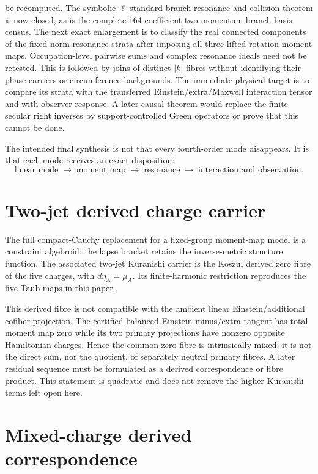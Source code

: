 \documentclass[11pt]{article}
\theoremstyle{definition}
\theoremstyle{remark}
\begin{document}
be recomputed.
The symbolic-\(\ell\) standard-branch resonance and collision theorem is now
closed, as is the complete 164-coefficient two-momentum branch-basis census.
The next exact enlargement is to classify the real connected components of
the fixed-norm resonance strata after imposing all three lifted rotation
moment maps.  Occupation-level pairwise sums and complex resonance ideals need
not be retested.  This is followed by joins of distinct \(|k|\)
fibres without identifying their phase carriers or circumference backgrounds.
The immediate physical target is to compare its strata with the transferred
Einstein/extra/Maxwell interaction tensor and with observer response.  A
later causal theorem would replace the finite secular right inverses by
support-controlled Green operators or prove that this cannot be done.

The intended final synthesis is not that every fourth-order mode disappears.
It is that each mode receives an exact disposition:
\[
 \boxed{\text{linear mode}\;\to\;\text{moment map}\;\to\;
 \text{resonance}\;\to\;\text{interaction and observation}.}
\]

\section{Two-jet derived charge carrier}

The full compact-Cauchy replacement for a fixed-group moment-map model is a
constraint algebroid: the lapse bracket retains the inverse-metric structure
function.  The associated two-jet Kuranishi carrier is the Koszul derived zero
fibre of the five charges, with $d\eta_A=\mu_A$.  Its finite-harmonic
restriction reproduces the five Taub maps in this paper.

This derived fibre is not compatible with the ambient linear
Einstein/additional cofiber projection.  The certified balanced
Einstein-minus/extra tangent has total moment map zero while its two primary
projections have nonzero opposite Hamiltonian charges.  Hence the common
zero fibre is intrinsically mixed; it is not the direct sum, nor the quotient,
of separately neutral primary fibres.  A later residual sequence must be
formulated as a derived correspondence or fibre product.  This statement is
quadratic and does not remove the higher Kuranishi terms left open here.

\section{Mixed-charge derived correspondence}
\end{document}
